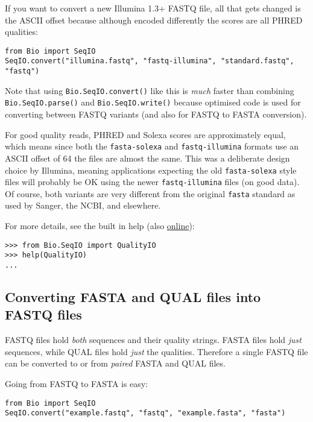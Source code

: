 \documentclass{report}
\begin{document}
If you want to convert a new Illumina 1.3+ FASTQ file, all that gets changed
is the ASCII offset because although encoded differently the scores are all
PHRED qualities:

\begin{verbatim}
from Bio import SeqIO
SeqIO.convert("illumina.fastq", "fastq-illumina", "standard.fastq", "fastq")
\end{verbatim}

Note that using \verb|Bio.SeqIO.convert()| like this is \emph{much} faster
than combining \verb|Bio.SeqIO.parse()| and \verb|Bio.SeqIO.write()|
because optimised code is used for converting between FASTQ variants
(and also for FASTQ to FASTA conversion).

For good quality reads, PHRED and Solexa scores are approximately equal,
which means since both the \texttt{fasta-solexa} and \texttt{fastq-illumina}
formats use an ASCII offset of 64 the files are almost the same. This was a
deliberate design choice by Illumina, meaning applications expecting the old
\texttt{fasta-solexa} style files will probably be OK using the newer
\texttt{fastq-illumina} files (on good data). Of course, both variants are
very different from the original \texttt{fasta} standard as used by Sanger,
the NCBI, and elsewhere.

For more details, see the built in help (also \href{http://www.biopython.org/DIST/docs/api/Bio.SeqIO.QualityIO-module.html}{online}):

\begin{verbatim}
>>> from Bio.SeqIO import QualityIO
>>> help(QualityIO)
...
\end{verbatim}

\subsection{Converting FASTA and QUAL files into FASTQ files}
\label{sec:SeqIO-fasta-qual-conversion}

FASTQ files hold \emph{both} sequences and their quality strings.
FASTA files hold \emph{just} sequences, while QUAL files hold \emph{just}
the qualities. Therefore a single FASTQ file can be converted to or from
\emph{paired} FASTA and QUAL files.

Going from FASTQ to FASTA is easy:

\begin{verbatim}
from Bio import SeqIO
SeqIO.convert("example.fastq", "fastq", "example.fasta", "fasta")
\end{verbatim}
\end{document}
